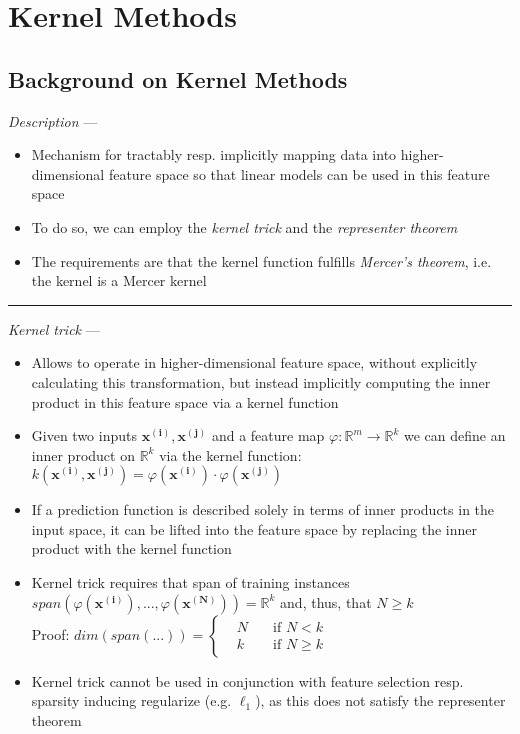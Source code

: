 \section{Kernel Methods}
\subsection*{Background on Kernel Methods}
\emph{Description} ---
\begin{itemize}
    \item Mechanism for tractably resp. implicitly mapping data into higher-dimensional feature space so that linear models can be used in this feature space
    \item To do so, we can employ the \emph{kernel trick} and the \emph{representer theorem}
    \item The requirements are that the kernel function fulfills \emph{Mercer's theorem}, i.e. the kernel is a Mercer kernel
\end{itemize}

{\color{lightgray}\hrule height 0.001mm}

\emph{Kernel trick} ---
\begin{itemize}
    \item Allows to operate in higher-dimensional feature space, without explicitly calculating this transformation, but instead implicitly computing the inner product in this feature space via a kernel function
    \item Given two inputs $\boldsymbol{x^{(i)}}, \boldsymbol{x^{(j)}}$ and a feature map $\varphi: \mathbb{R}^m \rightarrow \mathbb{R}^k$ we can define an inner product on $\mathbb{R}^k$ via the kernel function: $k(\boldsymbol{x^{(i)}}, \boldsymbol{x^{(j)}}) = \varphi(\boldsymbol{x^{(i)}}) \cdot \varphi(\boldsymbol{x^{(j)}})$
    \item If a prediction function is described solely in terms of inner products in the input space, it can be lifted into the feature space by replacing the inner product with the kernel function
    \item Kernel trick requires that span of training instances  $span(\varphi(\boldsymbol{x^{(i)}}), ..., \varphi(\boldsymbol{x^{(N)}})) = \mathbb{R}^k$ and, thus, that $N \geq k$\\
    Proof:
    $dim(span(...)) = 
    \left\{
        \begin{aligned}
             & N \quad & \text{if } N < k \\
             & k \quad & \text{if } N \geq k
        \end{aligned}
    \right.
    $
    \item Kernel trick cannot be used in conjunction with feature selection resp. sparsity inducing regularize (e.g. $\ell_1$), as this does not satisfy the representer theorem
\end{itemize}

